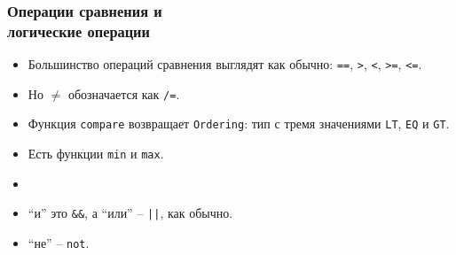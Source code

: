 \documentclass[10pt]{beamer}
\begin{document}
\begin{frame}[fragile]
\frametitle{Операции сравнения и\\логические операции}
\begin{itemize}
    \item Большинство операций сравнения выглядят как обычно: \lstinline|==|, \lstinline|>|, \lstinline|<|, \lstinline|>=|, \lstinline|<=|.
    \item Но $\neq$ обозначается как \lstinline|/=|.
    \item Функция \lstinline|compare| возвращает \lstinline|Ordering|: тип с тремя значениями \lstinline|LT|, \lstinline|EQ| и \lstinline|GT|.
    \item Есть функции \lstinline|min| и \lstinline|max|.
    \item[]
    \item \enquote{и} это \lstinline|&&|, а \enquote{или} -- \lstinline!||!, как обычно. 
    \item \enquote{не} -- \lstinline|not|.
\end{itemize}
\end{frame}
\end{document}
